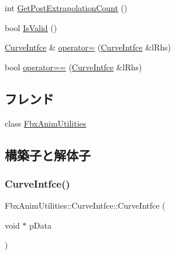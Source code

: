 \begin{DoxyCompactItemize}
\item 
int \hyperlink{class_fbx_anim_utilities_1_1_curve_intfce_af0138ff660c5ea80bab90abfdead87c0}{Get\+Post\+Extrapolation\+Count} ()
\item 
bool \hyperlink{class_fbx_anim_utilities_1_1_curve_intfce_aea0db520834b8dc5b8a7e55567a74036}{Is\+Valid} ()
\item 
\hyperlink{class_fbx_anim_utilities_1_1_curve_intfce}{Curve\+Intfce} \& \hyperlink{class_fbx_anim_utilities_1_1_curve_intfce_a0917c685f7bc760a34bf2faf9278eb2c}{operator=} (\hyperlink{class_fbx_anim_utilities_1_1_curve_intfce}{Curve\+Intfce} \&l\+Rhs)
\item 
bool \hyperlink{class_fbx_anim_utilities_1_1_curve_intfce_a631e6326758efb7b2e6ee97bc183d976}{operator==} (\hyperlink{class_fbx_anim_utilities_1_1_curve_intfce}{Curve\+Intfce} \&l\+Rhs)
\end{DoxyCompactItemize}
\subsection*{フレンド}
\begin{DoxyCompactItemize}
\item 
class \hyperlink{class_fbx_anim_utilities_1_1_curve_intfce_aeacafd3baeb97bc8863c00bb6de0073d}{Fbx\+Anim\+Utilities}
\end{DoxyCompactItemize}


\subsection{構築子と解体子}
\mbox{\label{class_fbx_anim_utilities_1_1_curve_intfce_abe47bbd049aff725a33efffae4b1e8cd}} 
\subsubsection{\texorpdfstring{Curve\+Intfce()}{CurveIntfce()}\hspace{0.1cm}{\footnotesize\ttfamily [1/2]}}
{\footnotesize\ttfamily Fbx\+Anim\+Utilities\+::\+Curve\+Intfce\+::\+Curve\+Intfce (\begin{DoxyParamCaption}\item[{void $\ast$}]{p\+Data }\end{DoxyParamCaption})}

